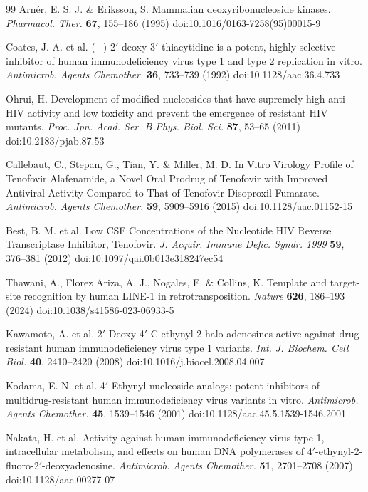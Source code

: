 \documentclass[11pt,twocolumn,twoside]{extarticle}
\begin{document}
\begin{thebibliography}{99}
 Arn\'er, E. S. J. \& Eriksson, S. Mammalian deoxyribonucleoside kinases. \textit{Pharmacol. Ther.} \textbf{67}, 155--186 (1995) doi:10.1016/0163-7258(95)00015-9

 Coates, J. A. et al. ($-$)-2$'$-deoxy-3$'$-thiacytidine is a potent, highly selective inhibitor of human immunodeficiency virus type 1 and type 2 replication in vitro. \textit{Antimicrob. Agents Chemother.} \textbf{36}, 733--739 (1992) doi:10.1128/aac.36.4.733

 Ohrui, H. Development of modified nucleosides that have supremely high anti-HIV activity and low toxicity and prevent the emergence of resistant HIV mutants. \textit{Proc. Jpn. Acad. Ser. B Phys. Biol. Sci.} \textbf{87}, 53--65 (2011) doi:10.2183/pjab.87.53

 Callebaut, C., Stepan, G., Tian, Y. \& Miller, M. D. In Vitro Virology Profile of Tenofovir Alafenamide, a Novel Oral Prodrug of Tenofovir with Improved Antiviral Activity Compared to That of Tenofovir Disoproxil Fumarate. \textit{Antimicrob. Agents Chemother.} \textbf{59}, 5909--5916 (2015) doi:10.1128/aac.01152-15

 Best, B. M. et al. Low CSF Concentrations of the Nucleotide HIV Reverse Transcriptase Inhibitor, Tenofovir. \textit{J. Acquir. Immune Defic. Syndr. 1999} \textbf{59}, 376--381 (2012) doi:10.1097/qai.0b013e318247ec54

 Thawani, A., Florez Ariza, A. J., Nogales, E. \& Collins, K. Template and target-site recognition by human LINE-1 in retrotransposition. \textit{Nature} \textbf{626}, 186--193 (2024) doi:10.1038/s41586-023-06933-5

 Kawamoto, A. et al. 2$'$-Deoxy-4$'$-C-ethynyl-2-halo-adenosines active against drug-resistant human immunodeficiency virus type 1 variants. \textit{Int. J. Biochem. Cell Biol.} \textbf{40}, 2410--2420 (2008) doi:10.1016/j.biocel.2008.04.007

 Kodama, E. N. et al. 4$'$-Ethynyl nucleoside analogs: potent inhibitors of multidrug-resistant human immunodeficiency virus variants in vitro. \textit{Antimicrob. Agents Chemother.} \textbf{45}, 1539--1546 (2001) doi:10.1128/aac.45.5.1539-1546.2001

 Nakata, H. et al. Activity against human immunodeficiency virus type 1, intracellular metabolism, and effects on human DNA polymerases of 4$'$-ethynyl-2-fluoro-2$'$-deoxyadenosine. \textit{Antimicrob. Agents Chemother.} \textbf{51}, 2701--2708 (2007) doi:10.1128/aac.00277-07


\end{thebibliography}
\end{document}
